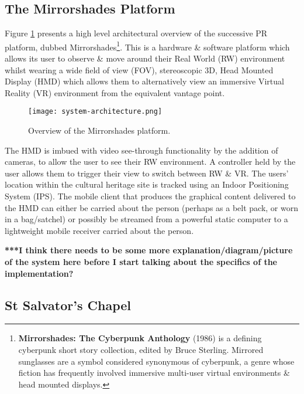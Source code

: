 \subsection{The Mirrorshades Platform}

Figure \ref{systemarchitecture} presents a high level architectural overview of the successive PR platform, dubbed Mirrorshades\footnote{\textbf{Mirrorshades: The Cyberpunk Anthology} (1986) is a defining cyberpunk short story collection, edited by Bruce Sterling. Mirrored sunglasses are a symbol considered synonymous of cyberpunk, a genre whose fiction has frequently involved immersive multi-user virtual environments \& head mounted displays.}. This is a hardware \& software platform which allows its user to observe \& move around their Real World (RW) environment whilst wearing a wide field of view (FOV), stereoscopic 3D, Head Mounted Display (HMD) which allows them to alternatively view an immersive Virtual Reality (VR) environment from the equivalent vantage point.

\begin{figure}[h]
	\begin{center}
		\texttt{[image: system-architecture.png]}
		\caption{Overview of the Mirrorshades platform.}
		\label{systemarchitecture}
	\end{center}
\end{figure}

The HMD is imbued with video see-through functionality by the addition of cameras, to allow the user to see their RW environment. A controller held by the user allows them to trigger their view to switch between RW \& VR. The users' location within the cultural heritage site is tracked using an Indoor Positioning System (IPS). The mobile client that produces the graphical content delivered to the HMD can either be carried about the person (perhaps as a belt pack, or worn in a bag/satchel) or possibly be streamed from a powerful static computer to a lightweight mobile receiver carried about the person.

\textbf{***I think there needs to be some more explanation/diagram/picture of the system here before I start talking about the specifics of the implementation?}


\subsection{St Salvator's Chapel}

